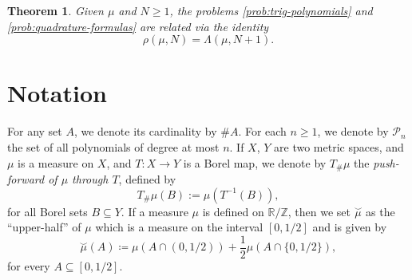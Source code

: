 \documentclass[reqno, a4paper]{amsart}
\def\T{\mathbb{R}/\mathbb{Z}}
\newcommand{\muarc}{\overset{\smallsmile}{\mu}}
\theoremstyle{plain}
\newtheorem{theorem}{Theorem}
\theoremstyle{definition}
\theoremstyle{remarkstyle}
\numberwithin{equation}{section}
\begin{document}
\begin{theorem}\label{thm:equivalence-with-quadrature-problem}
    Given $\mu$ and $N \geq 1$, the problems \textnormal{\ref{prob:trig-polynomials}} and \textnormal{\ref{prob:quadrature-formulas}} are related via the identity 
    \begin{equation*}
        \rho(\mu, N)=\Lambda(\mu, N+1).
    \end{equation*}
\end{theorem}
\section*{Notation}
For any set $A$, we denote its cardinality by $\# A$. For each $n\geq 1$, we denote by $\mathcal{P}_n$ the set of all polynomials of degree at most $n$. If $X$, $Y$ are two metric spaces, and $\mu$ is a measure on $X$, and $T : X \to Y$ is a Borel map, we denote by $T_{\#}\mu$ the \emph{push-forward of $\mu$ through $T$}, defined by
\begin{equation*}
    T_{\#}\mu(B) := \mu(T^{-1}(B)),
\end{equation*}
for all Borel sets $B\subseteq Y$. If a measure $\mu$ is defined on $\T$, then we set $\muarc$ as the ``upper-half'' of $\mu$ which is a measure on the interval $[0, 1/2]$ and is given by
\begin{equation*}
    \muarc(A)\coloneqq \mu(A\cap (0, 1/2))+ \frac{1}{2}\mu(A\cap \{0, 1/2\}),
\end{equation*}
for every $A\subseteq[0, 1/2]$.
\end{document}
